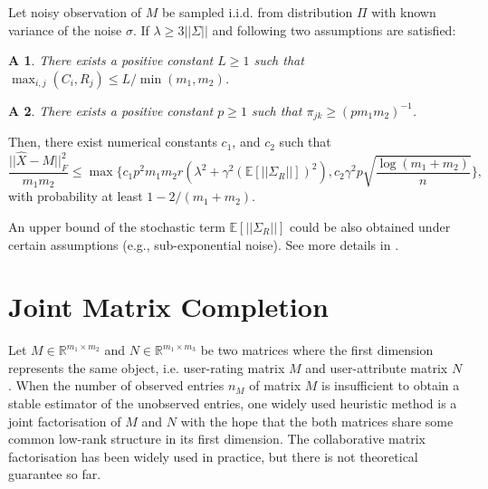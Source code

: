 \documentclass{article} %
\newtheorem{assumption}{A}
\begin{document}
\begin{theorem} 
Let noisy observation of $M$ be sampled i.i.d. from distribution $\Pi$ with known variance of the noise $\sigma$. If $\lambda \geq 3||\Sigma||$ and following two assumptions are satisfied:

\begin{assumption}
\label{assume:row_column}
There exists a positive constant $L \geq 1 $ such that
$\max_{i,j}(C_i, R_j) \leq L / \min(m_1, m_2)$.
\end{assumption}

\begin{assumption}
\label{assume:min_p}
There exists a positive constant $p \geq 1 $ such that
$\pi_{jk} \geq (p m_1 m_2)^{-1}$.
\end{assumption}

Then, there exist numerical constants $c_1$, and $c_2$ such that
\begin{equation}
\frac{||\hat{X} - M||_F^2}{m_1m_2} \leq \max\bigg\{ c_1 p^2 m_1 m_2 r (\lambda^2 + \gamma^2(\mathbb{E}[||\Sigma_R||])^2), c_2\gamma^2p\sqrt{\frac{\log(m_1 + m_2)}{n}} \bigg\},
\end{equation}
with probability at least $1 - 2/(m_1 + m_2)$.
\end{theorem}

An upper bound of the stochastic term $\mathbb{E}[||\Sigma_R||]$ could be also obtained under certain assumptions (e.g., sub-exponential noise). See more details in \cite{klopp2014noisy}.


\section{Joint Matrix Completion}
Let $M \in \mathbb{R}^{m_1 \times m_2}$ and $N \in \mathbb{R}^{m_1 \times m_3}$ be two matrices where the first dimension represents the same object, i.e. user-rating matrix $M$ and user-attribute matrix $N$. When the number of observed entries $n_M$ of matrix $M$ is insufficient to obtain a stable estimator of the unobserved entries, one widely used heuristic method is a joint factorisation of $M$ and $N$ with the hope that the both matrices share some common low-rank structure in its first dimension. The collaborative matrix factorisation has been widely used in practice, but there is not theoretical guarantee so far.
\end{document}
